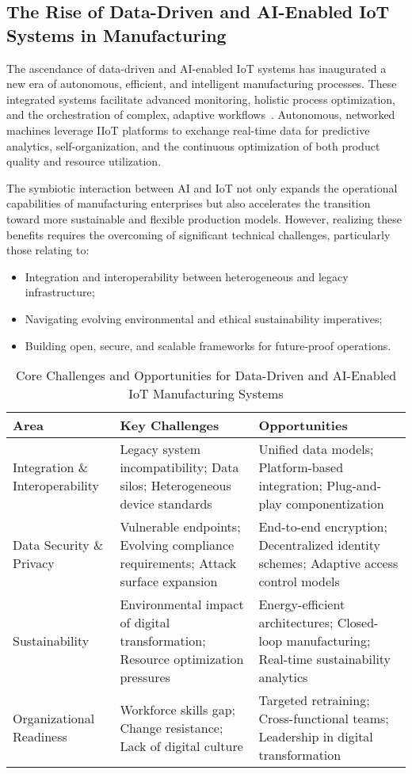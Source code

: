 \subsection{The Rise of Data-Driven and AI-Enabled IoT Systems in Manufacturing}

The ascendance of data-driven and AI-enabled IoT systems has inaugurated a new era of autonomous, efficient, and intelligent manufacturing processes. These integrated systems facilitate advanced monitoring, holistic process optimization, and the orchestration of complex, adaptive workflows~\cite{ref31}. Autonomous, networked machines leverage IIoT platforms to exchange real-time data for predictive analytics, self-organization, and the continuous optimization of both product quality and resource utilization.

The symbiotic interaction between AI and IoT not only expands the operational capabilities of manufacturing enterprises but also accelerates the transition toward more sustainable and flexible production models. However, realizing these benefits requires the overcoming of significant technical challenges, particularly those relating to:
\begin{itemize}
    \item Integration and interoperability between heterogeneous and legacy infrastructure;
    \item Navigating evolving environmental and ethical sustainability imperatives;
    \item Building open, secure, and scalable frameworks for future-proof operations.
\end{itemize}

\begin{table*}[htbp]
\centering
\caption{Core Challenges and Opportunities for Data-Driven and AI-Enabled IoT Manufacturing Systems}
\label{tab:ai_iot_challenges}
\begin{adjustbox}{max width=\textwidth}
\begin{tabular}{lll}
\toprule
\textbf{Area} & \textbf{Key Challenges} & \textbf{Opportunities} \\
\midrule
Integration \& Interoperability & Legacy system incompatibility; Data silos; Heterogeneous device standards & Unified data models; Platform-based integration; Plug-and-play componentization \\
Data Security \& Privacy & Vulnerable endpoints; Evolving compliance requirements; Attack surface expansion & End-to-end encryption; Decentralized identity schemes; Adaptive access control models \\
Sustainability & Environmental impact of digital transformation; Resource optimization pressures & Energy-efficient architectures; Closed-loop manufacturing; Real-time sustainability analytics \\
Organizational Readiness & Workforce skills gap; Change resistance; Lack of digital culture & Targeted retraining; Cross-functional teams; Leadership in digital transformation \\
\bottomrule
\end{tabular}
\end{adjustbox}
\end{table*}

